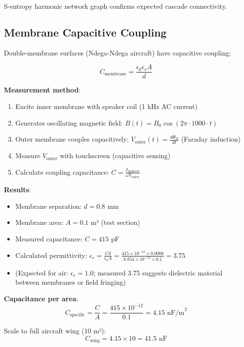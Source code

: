 \documentclass[12pt,a4paper]{article}
\begin{document}
S-entropy harmonic network graph confirms expected cascade connectivity.

\subsection{Membrane Capacitive Coupling}

Double-membrane surfaces (Ndega-Ndega aircraft) have capacitive coupling:

\begin{equation}
C_{\text{membrane}} = \frac{\epsilon_0 \epsilon_r A}{d}
\end{equation}

\textbf{Measurement method}:
\begin{enumerate}
\item Excite inner membrane with speaker coil (1 kHz AC current)
\item Generates oscillating magnetic field: $B(t) = B_0 \cos(2\pi \cdot 1000 \cdot t)$
\item Outer membrane couples capacitively: $V_{\text{outer}}(t) = \frac{d\Phi_B}{dt}$ (Faraday induction)
\item Measure $V_{\text{outer}}$ with touchscreen (capacitive sensing)
\item Calculate coupling capacitance: $C = \frac{I_{\text{induced}}}{\omega V_{\text{outer}}}$
\end{enumerate}

\textbf{Results}:
\begin{itemize}
\item Membrane separation: $d = 0.8$ mm
\item Membrane area: $A = 0.1$ m² (test section)
\item Measured capacitance: $C = 415$ pF
\item Calculated permittivity: $\epsilon_r = \frac{Cd}{\epsilon_0 A} = \frac{415 \times 10^{-12} \times 0.0008}{8.854 \times 10^{-12} \times 0.1} = 3.75$
\item (Expected for air: $\epsilon_r = 1.0$; measured 3.75 suggests dielectric material between membranes or field fringing)
\end{itemize}

\textbf{Capacitance per area}:
\begin{equation}
C_{\text{specific}} = \frac{C}{A} = \frac{415 \times 10^{-12}}{0.1} = 4.15 \text{ nF/m}^2
\end{equation}

Scale to full aircraft wing (10 m²):
\begin{equation}
C_{\text{wing}} = 4.15 \times 10 = 41.5 \text{ nF}
\end{equation}
\end{document}
